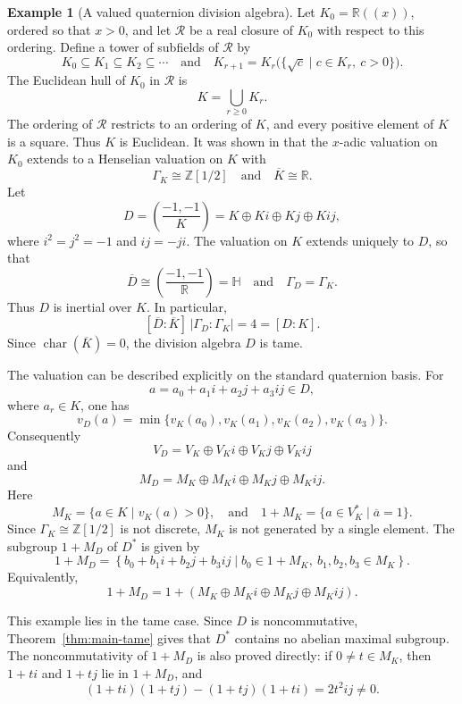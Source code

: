 \documentclass[11pt]{amsart}
\theoremstyle{definition}
\newtheorem{example}[theorem]{Example}
\begin{document}
\begin{example}[A valued quaternion division algebra]
\label{ex:valued-quaternion}
Let $K_0=\mathbb R((x))$, ordered so that $x>0$, and let $\mathcal R$ be a real closure of $K_0$ with respect to this ordering. Define a tower of subfields of $\mathcal R$ by 
\[ 
K_0\subseteq K_1\subseteq K_2\subseteq\cdots 
\quad 
\text{and}
\quad
K_{r+1}=K_r\bigl(\{\sqrt c\mid c\in K_r,\ c>0\}\bigr). 
\] 
The Euclidean hull of $K_0$ in $\mathcal R$ is \[ K=\bigcup_{r\geq 0}K_r. \] The ordering of $\mathcal R$ restricts to an ordering of $K$, and every positive element of $K$ is a square. Thus $K$ is Euclidean. It was shown in \cite[Example~7]{HaW1} that the $x$-adic valuation on $K_0$ extends to a Henselian valuation on $K$ with 
\[ 
\Gamma_K\cong \mathbb Z[1/2]
\quad
\text{and}
\quad
\overline K\cong \mathbb R. 
\] 
Let 
\[ 
D=\left(\frac{-1,-1}{K}\right) = K\oplus Ki\oplus Kj\oplus Kij, 
\]
where $i^2=j^2=-1$ and $ij=-ji$. The valuation on $K$ extends uniquely to $D$, so that
\[
        \overline D\cong
        \left(\frac{-1,-1}{\mathbb R}\right)
        =
        \mathbb H
        \quad\text{and}\quad
        \Gamma_D=\Gamma_K.
\]
Thus $D$ is inertial over $K$.  In particular,
\[
        [\overline D:\overline K]\,|\Gamma_D:\Gamma_K|
        =
        4
        =
        [D:K].
\]
Since $\operatorname{char}(\overline K)=0$, the
division algebra $D$ is tame.

The valuation can be described explicitly on the standard quaternion basis.
For
\[
        a=a_0+a_1i+a_2j+a_3ij\in D,
\]
where $a_r\in K$, one has
\[
        v_D(a)=\min\{v_K(a_0),v_K(a_1),v_K(a_2),v_K(a_3)\}.
\]
Consequently
\[
        V_D=V_K\oplus V_Ki\oplus V_Kj\oplus V_Kij
\]
and
\[
        M_D=M_K\oplus M_Ki\oplus M_Kj\oplus M_Kij.
\]
Here
\[
        M_K=\{a\in K\mid v_K(a)>0\},
        \quad\text{and}\quad
        1+M_K=\{a\in V_K^*\mid \overline a=1\}.
\]
Since $\Gamma_K\cong\mathbb Z[1/2]$ is not discrete, $M_K$ is not generated by a single element.  The subgroup $1+M_D$ of $D^*$ is given by
\[
        1+M_D
        =
        \left\{
        b_0+b_1i+b_2j+b_3ij
        \mid
        b_0\in 1+M_K,\ b_1,b_2,b_3\in M_K
        \right\}.
\]
Equivalently,
\[
        1+M_D
        =
        1+(M_K\oplus M_Ki\oplus M_Kj\oplus M_Kij).
\]

This example lies in the tame case.  Since $D$ is noncommutative, Theorem~\ref{thm:main-tame} gives that $D^*$ contains no abelian maximal
subgroup.  The noncommutativity of $1+M_D$ is also proved directly: if $0\ne t\in M_K$, then $1+ti$ and $1+tj$ lie in $1+M_D$, and
\[
        (1+ti)(1+tj)-(1+tj)(1+ti)=2t^2ij\ne 0.
\]
\end{example}
\end{document}
